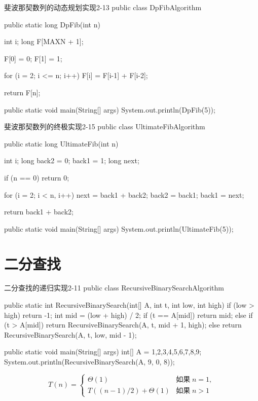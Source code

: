 \documentclass[oneside,10pt,fontset=none]{ctexbook}
\numberwithin{definition}{chapter}
\numberwithin{theorem}{chapter}
\numberwithin{lemma}{chapter}
\begin{document}
\begin{myjava}{}{斐波那契数列的动态规划实现}{2-13}
public class DpFibAlgorithm {
    public static long DpFib(int n) {
        int i;
        long F[MAXN + 1];
    
        F[0] = 0;
        F[1] = 1;
    
        for (i = 2; i <= n; i++)
            F[i] = F[i-1] + F[i-2];
    
        return F[n];
    }

    public static void main(String[] args) {
        System.out.println(DpFib(5));
    }
}
\end{myjava}

\begin{myjava}{}{斐波那契数列的终极实现}{2-15}
public class UltimateFibAlgorithm {
    public static long UltimateFib(int n) {
        int i;
        long back2 = 0; back1 = 1;
        long next;
    
        if (n == 0) return 0;
    
        for (i = 2; i < n, i++) {
            next = back1 + back2;
            back2 = back1;
            back1 = next;
        }
    
        return back1 + back2;
    }

    public static void main(String[] args) {
        System.out.println(UltimateFib(5));
    }
}

\end{myjava}

\section{二分查找}

\begin{myjava}{}{二分查找的递归实现}{2-11}
public class RecursiveBinarySearchAlgorithm {
    public static int RecursiveBinarySearch(int[] A, int t, int low, int high) {
        if (low > high) return -1;
        int mid = (low + high) / 2;
        if (t == A[mid])
            return mid;
        else if (t > A[mid])
            return RecursiveBinarySearch(A, t, mid + 1, high);
        else
            return RecursiveBinarySearch(A, t, low, mid - 1);
    }

    public static void main(String[] args) {
        int[] A = {1,2,3,4,5,6,7,8,9};
        System.out.println(RecursiveBinarySearch(A, 9, 0, 8));
    }
}
\end{myjava}

\begin{equation*}
T(n) = \begin{cases}
\Theta(1) &\text{如果}\;n=1, \\
T((n-1)/2)+\Theta(1) &\text{如果}\;n>1
\end{cases}
\end{equation*}
\end{document}
